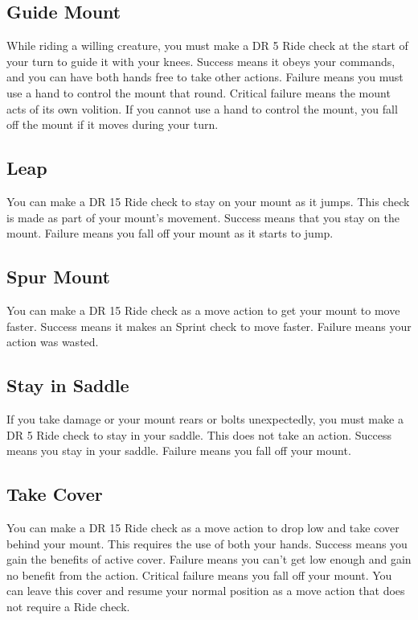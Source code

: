     \subsection{Guide Mount}
        While riding a willing creature, you must make a DR 5 Ride check at the start of your turn to guide it with your knees. Success means it obeys your commands, and you can have both hands free to take other actions. Failure means you must use a hand to control the mount that round. Critical failure means the mount acts of its own volition. If you cannot use a hand to control the mount, you fall off the mount if it moves during your turn.

    \subsection{Leap}
        You can make a DR 15 Ride check to stay on your mount as it jumps. This check is made as part of your mount's movement. Success means that you stay on the mount. Failure means you fall off your mount as it starts to jump.

    \subsection{Spur Mount}
        You can make a DR 15 Ride check as a move action to get your mount to move faster. Success means it makes an Sprint check to move faster. Failure means your action was wasted.

    \subsection{Stay in Saddle}
        If you take damage or your mount rears or bolts unexpectedly, you must make a DR 5 Ride check to stay in your saddle. This does not take an action. Success means you stay in your saddle. Failure means you fall off your mount.

    \subsection{Take Cover}
        You can make a DR 15 Ride check as a move action to drop low and take cover behind your mount. This requires the use of both your hands. Success means you gain the benefits of active cover. Failure means you can't get low enough and gain no benefit from the action. Critical failure means you fall off your mount. You can leave this cover and resume your normal position as a move action that does not require a Ride check.

